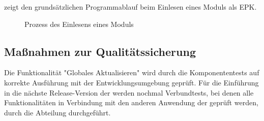  zeigt den grundsätzlichen Programmablauf beim Einlesen eines Moduls als \ac{EPK}.
\begin{figure}[htb]
\centering
{}
\caption{Prozess des Einlesens eines Moduls}
\label{fig:Modulimport}
\end{figure}



\subsection{Maßnahmen zur Qualitätssicherung}
\label{sec:Qualitaetssicherung}

Die Funktionalität "Globales Aktualisieren" wird durch die Komponententests auf korrekte Ausführung mit der Entwicklungsumgebung geprüft. Für die Einführung in die nächste Release-Version der \CBPAD werden nochmal Verbundtests, bei denen alle Funktionalitäten in Verbindung mit den anderen Anwendung der \CBP geprüft werden, durch die Abteilung durchgeführt.







